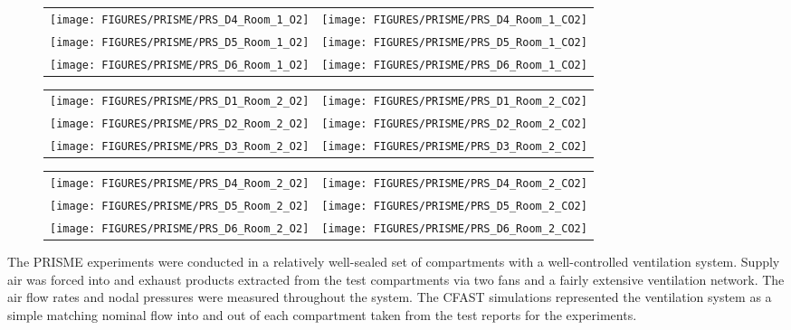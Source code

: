 \begin{figure}[p]
\begin{tabular*}{\textwidth}{l@{\extracolsep{\fill}}r}
\texttt{[image: FIGURES/PRISME/PRS\_D4\_Room\_1\_O2]} &
\texttt{[image: FIGURES/PRISME/PRS\_D4\_Room\_1\_CO2]} \\
\texttt{[image: FIGURES/PRISME/PRS\_D5\_Room\_1\_O2]} &
\texttt{[image: FIGURES/PRISME/PRS\_D5\_Room\_1\_CO2]} \\
\texttt{[image: FIGURES/PRISME/PRS\_D6\_Room\_1\_O2]} &
\texttt{[image: FIGURES/PRISME/PRS\_D6\_Room\_1\_CO2]}
\end{tabular*}
\label{PRISME_Gas_2}
\end{figure}

\begin{figure}[p]
\begin{tabular*}{\textwidth}{l@{\extracolsep{\fill}}r}
\texttt{[image: FIGURES/PRISME/PRS\_D1\_Room\_2\_O2]} &
\texttt{[image: FIGURES/PRISME/PRS\_D1\_Room\_2\_CO2]} \\
\texttt{[image: FIGURES/PRISME/PRS\_D2\_Room\_2\_O2]} &
\texttt{[image: FIGURES/PRISME/PRS\_D2\_Room\_2\_CO2]} \\
\texttt{[image: FIGURES/PRISME/PRS\_D3\_Room\_2\_O2]} &
\texttt{[image: FIGURES/PRISME/PRS\_D3\_Room\_2\_CO2]}
\end{tabular*}
\label{PRISME_Gas_3}
\end{figure}

\begin{figure}[p]
\begin{tabular*}{\textwidth}{l@{\extracolsep{\fill}}r}
\texttt{[image: FIGURES/PRISME/PRS\_D4\_Room\_2\_O2]} &
\texttt{[image: FIGURES/PRISME/PRS\_D4\_Room\_2\_CO2]} \\
\texttt{[image: FIGURES/PRISME/PRS\_D5\_Room\_2\_O2]} &
\texttt{[image: FIGURES/PRISME/PRS\_D5\_Room\_2\_CO2]} \\
\texttt{[image: FIGURES/PRISME/PRS\_D6\_Room\_2\_O2]} &
\texttt{[image: FIGURES/PRISME/PRS\_D6\_Room\_2\_CO2]}
\end{tabular*}
\label{PRISME_Gas_4}
\end{figure}

\clearpage

The PRISME experiments were conducted in a relatively well-sealed set of compartments with a well-controlled ventilation system. Supply air was forced into and exhaust products extracted from the test compartments via two fans and a fairly extensive ventilation network. The air flow rates and nodal pressures were measured throughout the system. The CFAST simulations represented the ventilation system as a simple matching nominal flow into and out of each compartment taken from the test reports for the experiments.

